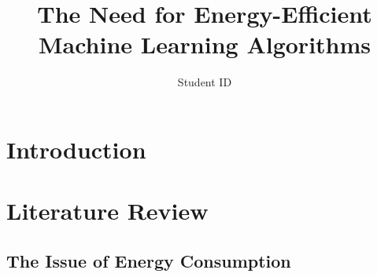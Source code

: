 \documentclass[a4paper, 11pt]{article}
\title{The Need for Energy-Efficient Machine Learning Algorithms}
\author{Student ID}
\date{}
\begin{document}
    \maketitle

    \section{Introduction}

    \section{Literature Review}

    \subsection{The Issue of Energy Consumption}
\end{document}
